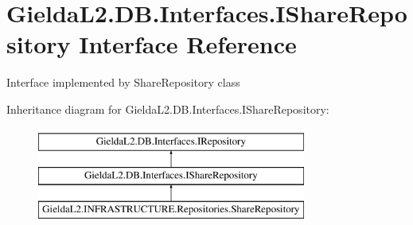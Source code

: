 \hypertarget{interface_gielda_l2_1_1_d_b_1_1_interfaces_1_1_i_share_repository}{}\section{Gielda\+L2.\+D\+B.\+Interfaces.\+I\+Share\+Repository Interface Reference}
\label{interface_gielda_l2_1_1_d_b_1_1_interfaces_1_1_i_share_repository}


Interface implemented by Share\+Repository class  


Inheritance diagram for Gielda\+L2.\+D\+B.\+Interfaces.\+I\+Share\+Repository\+:\begin{figure}[H]
\begin{center}
\leavevmode
\includegraphics[height=3.000000cm]{interface_gielda_l2_1_1_d_b_1_1_interfaces_1_1_i_share_repository}
\end{center}
\end{figure}
